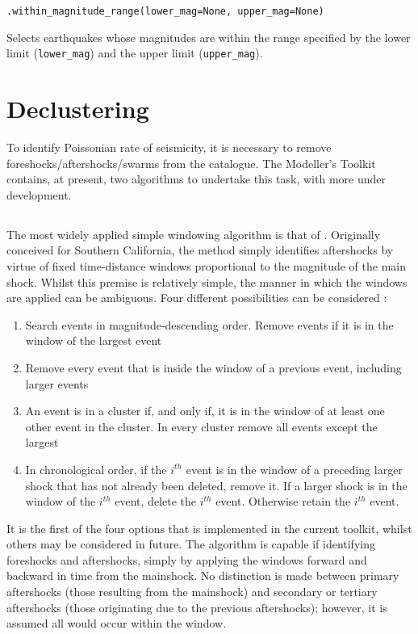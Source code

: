 \verb;.within_magnitude_range(lower_mag=None, upper_mag=None);

Selects earthquakes whose magnitudes are within the range specified by the lower limit (\verb=lower_mag=) and the upper limit (\verb=upper_mag=).

\section{Declustering}

To identify Poissonian rate of seismicity, it is necessary to remove foreshocks/aftershocks/swarms from the catalogue. The Modeller's Toolkit contains, at present, two algorithms to undertake this task, with more under development.

\subsection{\textcite{GardnerKnopoff1974}}

The most widely applied simple windowing algorithm is that of 
\textcite{GardnerKnopoff1974}. Originally conceived for Southern California, 
the method simply identifies aftershocks by virtue of fixed time-distance
windows proportional to the magnitude of the main shock. Whilst this 
premise is relatively simple, the manner in which the windows are 
applied can be ambiguous. Four different possibilities can be 
considered \parencite{LuenStark2012}:

\begin{enumerate}
\item Search events in magnitude-descending order. Remove events if it is 
    in the window of the largest event
\item Remove every event that is inside the window of a previous event, 
    including larger events
\item An event is in a cluster if, and only if, it is in the window of at 
    least one other event in the cluster. In every cluster remove all 
    events except the largest
\item In chronological order, if the $i^{th}$ event is in the window of a 
    preceding larger shock that has not already been deleted, remove it. 
    If a larger shock is in the window of the $i^{th}$ event, delete the 
    $i^{th}$ event. Otherwise retain the $i^{th}$ event.
\end{enumerate}

It is the first of the four options that is implemented in the current 
toolkit, whilst others may be considered in future.  The algorithm is 
capable if identifying foreshocks and aftershocks, simply by applying 
the windows forward and backward in time from the mainshock. 
No distinction is made between primary aftershocks (those resulting 
from the mainshock) and secondary or tertiary aftershocks (those 
originating due to the previous aftershocks); however, it is assumed 
all would occur within the window.

